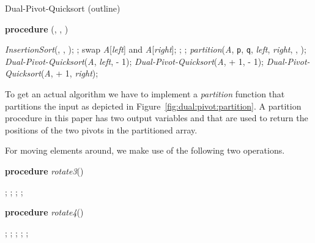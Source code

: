\documentclass[prodmode,acmtalg]{acmsmall}
\begin{document}
\renewcommand{\alglinenumber}[1]{\footnotesize{#1} }

\begin{algorithm}
    \caption{Dual-Pivot-Quicksort (outline)}\samepage\label{algo:dual:pivot:outline}
    \textbf{procedure} (, , )
    \begin{algorithmic}[1]
        \If{}
        \State \textit{InsertionSort}(, , );
            \State \Return;
        \EndIf
        \If{}
        \State swap \textit{A}[\textit{left}] and \textit{A}[\textit{right}];
        \EndIf
        \State ;
        \State ;
        \State \textit{partition}(\textit{A}, \texttt{p}, \texttt{q}, \textit{left}, \textit{right}, , );
        \State \textit{Dual-Pivot-Quicksort}(\textit{A}, \textit{left},  - 1);
        \State \textit{Dual-Pivot-Quicksort}(\textit{A},  + 1,  - 1);
        \State \textit{Dual-Pivot-Quicksort}(\textit{A},  + 1, \textit{right});
\end{algorithmic}
\end{algorithm}
To get an actual algorithm we have to implement a \textit{partition} function
that partitions the input as depicted in Figure~\ref{fig:dual:pivot:partition}.
A partition procedure in this paper has two output variables
 and  that are used to return
the positions of the two pivots in the partitioned array.

For moving elements around, we make use of the following two operations.

\begin{minipage}[t]{5cm}
\begin{algorithm}[H]
    \textbf{procedure} \textit{rotate3}()
    \begin{algorithmic}[1]
        \State ;
        \State ;
        \State ;
        \State ;
    \end{algorithmic}
\end{algorithm}
\end{minipage}
\begin{minipage}[t]{3cm}
    \hfill
\end{minipage}
\begin{minipage}[t]{5cm}
    \begin{algorithm}[H]
    \textbf{procedure} \textit{rotate4}()
    \begin{algorithmic}[1]
        \State ;
        \State ;
        \State ;
        \State ;
        \State ;
    \end{algorithmic}
    \end{algorithm}
\end{minipage}
\end{document}
